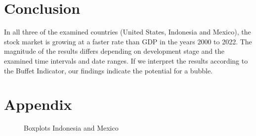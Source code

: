 \documentclass[12pt,a4paper,english]{article}
\begin{document}
\section{Conclusion}
In all three of the examined countries (United States, Indonesia and Mexico), the stock market is growing at a faster rate than GDP in the years 2000 to 2022. The magnitude of the results differs depending on development stage and the examined time intervals and date ranges. If we interpret the results according to the Buffet Indicator, our findings indicate the potential for a bubble. 

\newpage
\theendnotes

%






\printbibliography

%

\appendix 

\section{Appendix}

\begin{figure}[H]
	\centering
	
	\caption{Boxplots Indonesia and Mexico}
    \label{boxplots_indonesia_mexico}
\end{figure}
\end{document}
